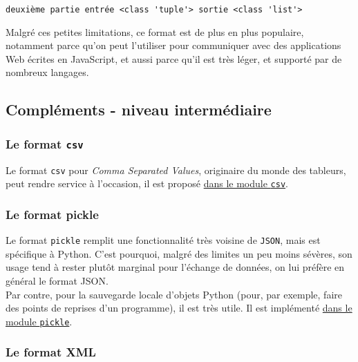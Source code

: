     \begin{Verbatim}[commandchars=\\\{\}]
deuxième partie entrée <class 'tuple'> sortie <class 'list'>

    \end{Verbatim}

    Malgré ces petites limitations, ce format est de plus en plus populaire,
notamment parce qu'on peut l'utiliser pour communiquer avec des
applications Web écrites en JavaScript, et aussi parce qu'il est très
léger, et supporté par de nombreux langages.

    \hypertarget{compluxe9ments---niveau-intermuxe9diaire}{%
\subsection{Compléments - niveau
intermédiaire}\label{compluxe9ments---niveau-intermuxe9diaire}}

    \hypertarget{le-format-csv}{%
\subsubsection{\texorpdfstring{Le format
\texttt{csv}}{Le format csv}}\label{le-format-csv}}

    Le format \texttt{csv} pour \emph{Comma Separated Values}, originaire du
monde des tableurs, peut rendre service à l'occasion, il est proposé
\href{https://docs.python.org/3/library/csv.html}{dans le module
\texttt{csv}}.

    \hypertarget{le-format-pickle}{%
\subsubsection{Le format pickle}\label{le-format-pickle}}

    Le format \texttt{pickle} remplit une fonctionnalité très voisine de
\texttt{JSON}, mais est spécifique à Python. C'est pourquoi, malgré des
limites un peu moins sévères, son usage tend à rester plutôt marginal
pour l'échange de données, on lui préfère en général le format JSON.\\

Par contre, pour la sauvegarde locale d'objets Python (pour, par
exemple, faire des points de reprises d'un programme), il est très
utile. Il est implémenté
\href{https://docs.python.org/3/library/pickle.html}{dans le module
\texttt{pickle}}.

    \hypertarget{le-format-xml}{%
\subsubsection{Le format XML}\label{le-format-xml}}


